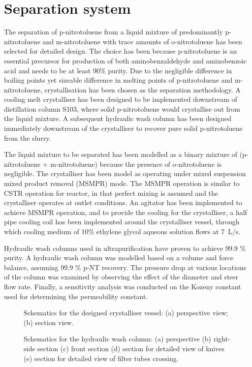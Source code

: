 \section*{Separation system}

The separation of p-nitrotoluene from a liquid mixture of predominantly p-nitrotoluene and m-nitrotoluene with trace amounts of o-nitrotoluene has been selected for detailed design. The choice has been because p-nitrotoluene is an essential precursor for production of both aminobenzaldehyde and aminobenzoic acid and needs to be at least 90\% purity. Due to the negligible difference in boiling points yet sizeable difference in melting points of p-nitrotoluene and m-nitrotoluene, crystallisation has been chosen as the separation methodology. A cooling melt crystalliser has been designed to be implemented downstream of distillation column S103, where solid p-nitrotoluene would crystallise out from the liquid mixture. A subsequent hydraulic wash column has been designed immediately downstream of the crystalliser to recover pure solid p-nitrotoluene from the slurry. 


The liquid mixture to be separated has been modelled as a binary mixture of (p-nitrotoluene + m-nitrotoluene) because the presence of o-nitrotoluene is negligible. The crystalliser has been model as operating under mixed suspension mixed product removal (MSMPR) mode. The MSMPR operation is similar to CSTR operation for reactor, in that perfect mixing is assumed and the crystalliser operates at outlet conditions. An agitator has been implemented to achieve MSMPR operation, and to provide the cooling for the crystalliser, a half pipe cooling coil has been implemented around the crystalliser vessel, through which cooling medium of 10\% ethylene glycol aqueous solution flows at \SI{7}{L/s}. 


Hydraulic wash columns used in ultrapurification have proven to achieve 99.9 \% purity. A hydraulic wash column was modelled based on a volume and force balance, assuming 99.9 \% p-NT recovery. The pressure drop at various locations of the column was examined by observing the effect of the diameter and steer flow rate. Finally, a sensitivity analysis was conducted on the Kozeny constant used for determining the permeability constant. 

\begin{figure}[h]
    \centering
    
    \caption{Schematics for the designed crystalliser vessel: (a) perspective view; (b) section view.}
    \label{fig:crystalliser schematic executive}
\end{figure}

\begin{figure}[h]
    \centering
    
    \caption{Schematics for the hydraulic wash column: (a) perspective (b) right-side section (c) front section (d) section for detailed view of knives (e) section for detailed view of filter tubes crossing.}
    \label{fig:wash column schematic executive}
\end{figure}